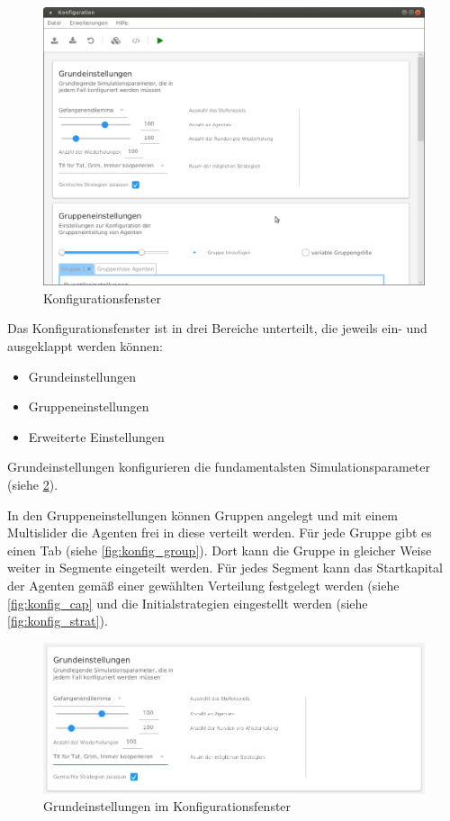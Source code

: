 \documentclass[parskip=full,11pt]{scrartcl}
\begin{document}
\begin{figure}[ht]
	\centering
	\includegraphics[width=\textwidth]{images/konfig.png}
	\caption{\label{fig:konfig}
		Konfigurationsfenster}
\end{figure} 

Das Konfigurationsfenster ist in drei Bereiche unterteilt, die jeweils ein- und ausgeklappt werden können:
\begin{itemize} \itemsep -10pt
	\item Grundeinstellungen
	\item Gruppeneinstellungen
	\item Erweiterte Einstellungen
\end{itemize}

Grundeinstellungen konfigurieren die fundamentalsten Simulationsparameter (siehe \cref{fig:konfig_main}).

In den Gruppeneinstellungen können Gruppen angelegt und mit einem Multislider die Agenten frei in diese verteilt werden. Für jede Gruppe gibt es einen Tab (siehe \cref{fig:konfig_group}). Dort kann die Gruppe in gleicher Weise weiter in Segmente eingeteilt werden. Für jedes Segment kann das Startkapital der Agenten gemäß einer gewählten Verteilung festgelegt werden (siehe \cref{fig:konfig_cap} und die Initialstrategien eingestellt werden (siehe \cref{fig:konfig_strat}).

\begin{figure}[ht]
	\centering
	\includegraphics[width=\textwidth]{images/konfig_main.png}
	\caption{\label{fig:konfig_main}
		Grundeinstellungen im Konfigurationsfenster}
\end{figure}
\end{document}
